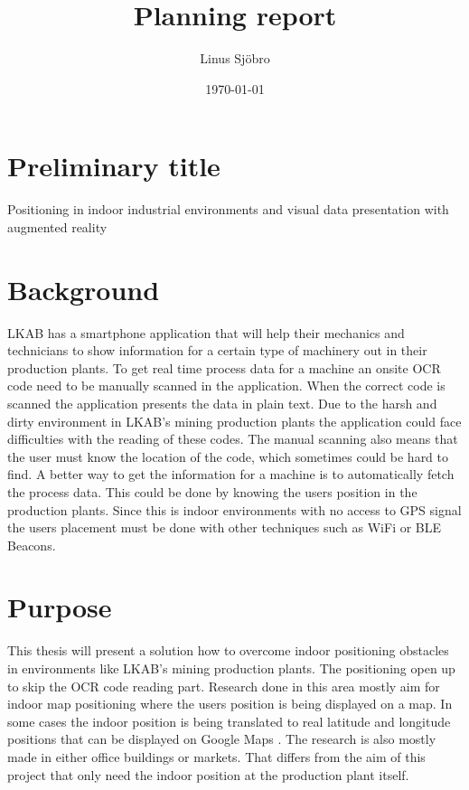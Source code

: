 \documentclass[12pt]{article}
\title{Planning report}
\author{Linus Sjöbro}
\date{\today}
\begin{document}
\maketitle

\section{Preliminary title}
Positioning in indoor industrial environments and visual data presentation with augmented reality

\section{Background}
LKAB has a smartphone application that will help their mechanics and technicians to show information for a certain type of machinery out in their production plants.
To get real time process data for a machine an onsite OCR code need to be manually scanned in the application.
When the correct code is scanned the application presents the data in plain text.
Due to the harsh and dirty environment in LKAB's mining production plants the application could face difficulties with the reading of these codes.
The manual scanning also means that the user must know the location of the code, which sometimes could be hard to find.
A better way to get the information for a machine is to automatically fetch the process data.
This could be done by knowing the users position in the production plants.
Since this is indoor environments with no access to GPS signal the users placement must be done with other techniques such as WiFi or BLE Beacons.

\section{Purpose}
This thesis will present a solution how to overcome indoor positioning obstacles in environments like LKAB's mining production plants.
The positioning open up to skip the OCR code reading part.
Research done in this area mostly aim for indoor map positioning where the users position is being displayed on a map.
In some cases the indoor position is being translated to real latitude and longitude positions that can be displayed on Google Maps \cite{DevelopmentMobileIndoor2017}.
The research is also mostly made in either office buildings or markets.
That differs from the aim of this project that only need the indoor position at the production plant itself.

\bigskip
\end{document}
